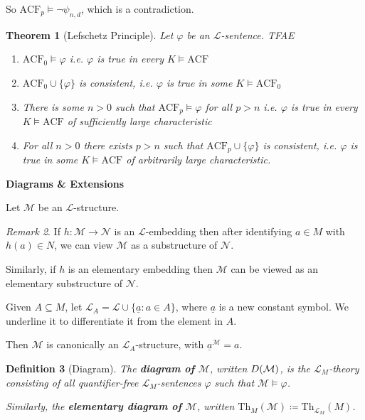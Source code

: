 \documentclass[]{article}
\theoremstyle{custhm}
\newtheorem{theorem}{Theorem}[section]
\theoremstyle{cusdef}
\newtheorem{defin}[theorem]{Definition}
\theoremstyle{custhm}
\theoremstyle{custhm}
\theoremstyle{custhm}
\theoremstyle{ex}
\theoremstyle{custhm}
\theoremstyle{cusdef}
\theoremstyle{remark}
\theoremstyle{remark}
\theoremstyle{numremark}
\newtheorem{numremark}[theorem]{Remark}
\newcommand{\ra}{\rightarrow}
\newcommand{\undf}[1]{\textit{\textbf{#1}}}
\renewcommand{\L}{\mathcal{L}}
\renewcommand{\it}[1]{\textit{#1}}
\newcommand{\M}{\mathcal{M}}
\renewcommand{\phi}{\varphi}
\newcommand{\Th}{\textrm{Th}}
\newcommand{\N}{\mathcal{N}}
\newcommand{\acf}{\textrm{ACF}}
\newcommand{\D}{\mathcal{D}}
\renewcommand{\subset}{\subseteq}
\begin{document}
So $\acf_p\models \neg\psi_{n,d}$, which is a contradiction.
\begin{theorem}[Lefschetz Principle]
Let $\phi$ be an $\L$-sentence. TFAE
\begin{enumerate}[label=(\arabic*)]
	\item $\acf_0\models \phi$ {\it i.e.} $\phi$ is true in every $K\models \acf$
	\item $\acf_0\cup\{\phi\}$ is consistent, {\it i.e.} $\phi$ is true in some $K\models \acf_0$
	\item There is some $n > 0$ such that $\acf_p\models\phi$ for all $p > n$ {\it i.e.} $\phi$ is true in every $K\models \acf$ of sufficiently large characteristic
	\item For all $n > 0$ there exists $p > n$ such that $\acf_p\cup\{\phi\}$ is consistent, {\it i.e.} $\phi$ is true in some $K\models \acf$ of arbitrarily large characteristic.
\end{enumerate}
\end{theorem}


\textbf{Diagrams \& Extensions}

Let $\M$ be an $\L$-structure.

\begin{numremark}
If $h:\M\ra\N$ is an $\L$-embedding then after identifying $a\in M$ with $h(a) \in N$, we can view $\M$ as a substructure of $\N$.

Similarly, if $h$ is an elementary embedding then $\M$ can be viewed as an elementary substructure of $\N$.
\end{numremark}

Given $A\subset M$, let $\L_A = \L\cup\{\underline{a}:a\in A\}$, where $\underline{a}$ is a new constant symbol. We underline it to differentiate it from the element in $A$.

Then $\M$ is canonically an $\L_A$-structure, with $\underline{a}^\M = a$.

\begin{defin}[Diagram]
The \undf{diagram of $\M$}, written $\\D(\M)$, is the $\L_M$-theory consisting of all quantifier-free $\L_M$-sentences $\phi$ such that $\M\models \phi$.

Similarly, the \undf{elementary diagram of $\M$}, written $\Th_M(\M)\coloneqq \Th_{\L_M}(M)$.
\end{defin}
\end{document}

